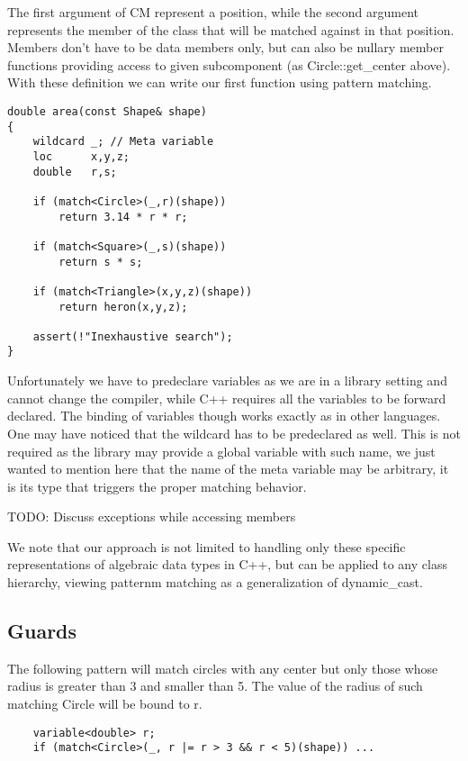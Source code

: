 \documentclass[preprint]{sigplanconf}
\begin{document}
The first argument of CM represent a position, while the second argument 
represents the member of the class that will be matched against in that position. 
Members don't have to be data members only, but can also be nullary member 
functions providing access to given subcomponent (as Circle::get\_center above).
With these definition we can write our first function using pattern matching.

\begin{lstlisting}
double area(const Shape& shape)
{
    wildcard _; // Meta variable
    loc      x,y,z;
    double   r,s;

    if (match<Circle>(_,r)(shape))
        return 3.14 * r * r;

    if (match<Square>(_,s)(shape))
        return s * s;

    if (match<Triangle>(x,y,z)(shape))
        return heron(x,y,z);

    assert(!"Inexhaustive search");
}
\end{lstlisting}

Unfortunately we have to predeclare variables as we are in a library setting and 
cannot change the compiler, while C++ requires all the variables to be forward 
declared. The binding of variables though works exactly as in other languages. 
One may have noticed that the wildcard has to be predeclared as well. This is 
not required as the library may provide a global variable with such name, we 
just wanted to mention here that the name of the meta variable may be arbitrary, 
it is its type that triggers the proper matching behavior.

TODO: Discuss exceptions while accessing members

We note that our approach is not limited to handling only these specific 
representations of algebraic data types in C++, but can be applied to any class 
hierarchy, viewing patternm matching as a generalization of 
dynamic\_cast.

\subsection{Guards}

The following pattern will match circles with any center but only those whose 
radius is greater than 3 and smaller than 5. The value of the radius of such 
matching Circle will be bound to r.

\begin{lstlisting}
    variable<double> r;
    if (match<Circle>(_, r |= r > 3 && r < 5)(shape)) ...
\end{lstlisting}
\end{document}
